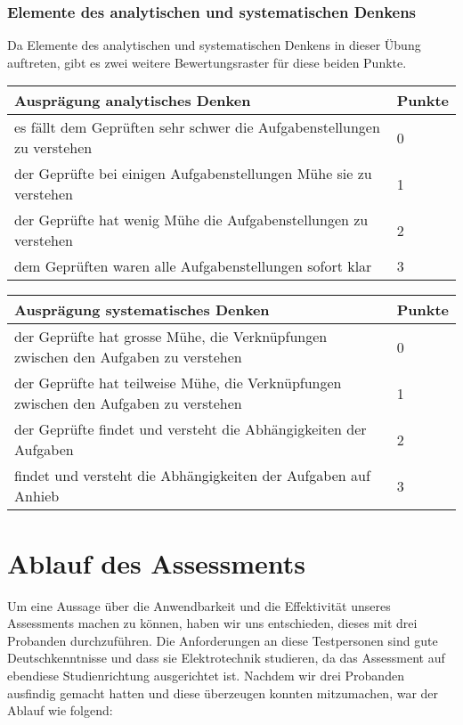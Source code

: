 \subsubsection{Elemente des analytischen und systematischen Denkens}
Da Elemente des analytischen und systematischen Denkens in dieser Übung auftreten, gibt es zwei weitere Bewertungsraster für diese beiden Punkte.

\begin{center}
  \begin{tabular}{ | p{11cm} | p{1cm} |}
   \hline
   \textbf{Ausprägung analytisches Denken} & \textbf{Punkte} \\ \hline
   es fällt dem Geprüften sehr schwer die Aufgabenstellungen zu verstehen & 0 \\ \hline
   der Geprüfte bei einigen Aufgabenstellungen Mühe sie zu verstehen  & 1 \\ \hline
   der Geprüfte hat wenig Mühe die Aufgabenstellungen zu verstehen & 2 \\ \hline
   dem Geprüften waren alle Aufgabenstellungen sofort klar & 3\\ \hline
  \end{tabular}
\end{center}

\begin{center}
  \begin{tabular}{ | p{11cm} | p{1cm} |}
   \hline
   \textbf{Ausprägung systematisches Denken} & \textbf{Punkte} \\ \hline
   der Geprüfte hat grosse Mühe, die Verknüpfungen zwischen den Aufgaben zu verstehen & 0 \\ \hline
    der Geprüfte hat teilweise Mühe, die Verknüpfungen zwischen den Aufgaben zu verstehen & 1 \\ \hline
   der Geprüfte findet und versteht die Abhängigkeiten der Aufgaben & 2 \\ \hline
   findet und versteht die Abhängigkeiten der Aufgaben auf Anhieb & 3\\ \hline
  \end{tabular}
\end{center}


\section{Ablauf des Assessments}

Um eine Aussage über die Anwendbarkeit und die Effektivität unseres Assessments machen zu können, haben wir uns entschieden, dieses mit drei Probanden durchzuführen. Die Anforderungen an diese Testpersonen sind gute Deutschkenntnisse und dass sie Elektrotechnik studieren, da das Assessment auf ebendiese Studienrichtung ausgerichtet ist. Nachdem wir drei Probanden ausfindig gemacht hatten und diese überzeugen konnten mitzumachen, war der Ablauf wie folgend:


